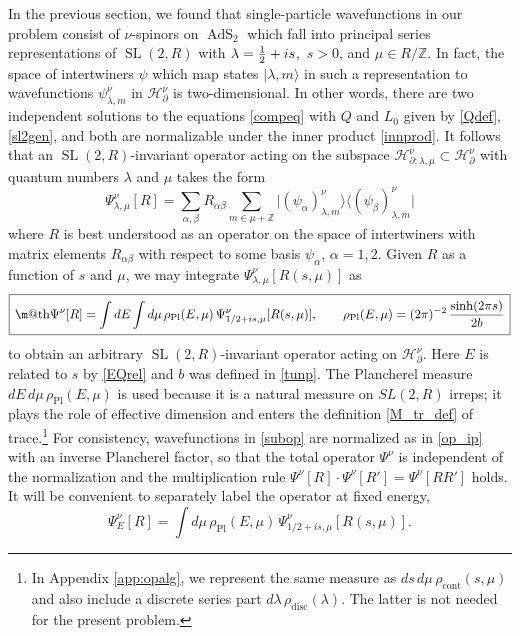 \documentclass[12pt]{article}
\makeatletter
\newcommand{\be}{\begin{equation}}
\newcommand{\ee}{\end{equation}}
\newcommand*{\wideboxed}[1]{\setlength{\fboxsep}{1ex}%
  \fbox{\m@th$\displaystyle#1$}}
\newcommand{\lt}{\left}
\newcommand{\rt}{\right}
\newcommand{\blangle}{\bigl\langle}
\newcommand{\brangle}{\bigr\rangle}
\newcommand*{\ket}[1]{|{#1}\rangle}
\newcommand*{\bbra}[1]{\blangle{#1}\big|}
\newcommand*{\bket}[1]{\big|{#1}\brangle}
\newcommand{\calH}{\mathcal{H}}
\newcommand{\ZZ}{\mathbb{Z}}
\newcommand{\RR}{\mathbb{R}}
\DeclareMathOperator{\SL}{SL}
\DeclareMathOperator{\tSL}{\widetilde{\mathrm{SL}}}
\DeclareMathOperator{\tAdS}{\widetilde{AdS}}
\newcommand{\rcont}{\rho_{\text{cont}}}
\newcommand{\rdisc}{\rho_{\text{disc}}}
\newcommand{\rPl}{\rho_{\text{Pl}}}
\newcommand{\al}{\alpha}
\newcommand{\lam}{\lambda}
\newcommand{\ov}{\over}
\newcommand{\p}{\partial}
\def\widetilde#1{#1}%
\def\SL{SL}
\def\RR{R}
\makeatother
\begin{document}
In the previous section, we found that single-particle wavefunctions in our problem consist of $\nu$-spinors on $\tAdS_2$ which fall into principal series representations of $\tSL(2,\RR)$ with $\lam={1 \ov 2}+i s$,\, $s>0$, and $\mu \in \RR/\ZZ$. In fact, the space of intertwiners $\psi$ which map states $\ket{\lam, m}$ in such a representation to wavefunctions $\psi^{\nu}_{\lam, m}$ in $\calH^{\nu}_{\p}$ is two-dimensional. In other words, there are two independent solutions to the equations \eqref{compeq} with $Q$ and $L_0$ given by \eqref{Qdef}, \eqref{sl2gen}, and both are normalizable under the inner product \eqref{innprod}. It follows that an $\tSL(2,\RR)$-invariant operator acting on the subspace $\calH^{\nu}_{\p; \lam, \mu}\subset \calH^{\nu}_{\p}$ with quantum numbers $\lam$ and $\mu$ takes the form
\be \label{subop}
\Psi^{\nu}_{\lam,\mu}[R]=\sum_{\alpha,\beta} R_{\alpha\beta} \sum_{m\in\mu+\ZZ}
\bket{\lt( \psi_{\alpha} \rt)^{\nu}_{\lambda,m}}
\bbra{\lt( \psi_{\beta} \rt)^{\nu}_{\lambda,m}}
\ee
where $R$ is best understood as an operator on the space of intertwiners with matrix elements $R_{\al\beta}$ with respect to some basis $\psi_{\al}$, $\al=1,2$. Given $R$ as a function of $s$ and $\mu$, we may integrate $\Psi^{\nu}_{\lam, \mu}[R(s,\mu)]$ as
\be \label{Mgenop}
\wideboxed{
\Psi^{\nu}[R]=\int dE \int d\mu\, \rPl(E, \mu)\, \Psi^{\nu}_{1/2+is,\mu}[R(s,\mu)], \qquad \rPl(E, \mu)=(2\pi)^{-2}\,{\sinh(2\pi s) \ov 2 b}}
\ee
to obtain an arbitrary $\tSL(2,\RR)$-invariant operator acting on $\calH^{\nu}_{\p}$. Here $E$ is related to $s$ by \eqref{EQrel} and $b$ was defined in \eqref{tunp}. The Plancherel measure $dE\,d\mu\,\rPl(E,\mu)$ is used because it is a natural measure on $\widetilde{\SL}(2,\RR)$ irreps; it plays the role of effective dimension and enters the definition \eqref{M_tr_def} of trace.\footnote{In Appendix \ref{app:opalg}, we represent the same measure as $ds\,d\mu\,\rcont(s,\mu)$ and also include a discrete series part $d\lambda\,\rdisc(\lambda)$. The latter is not needed for the present problem.} For consistency, wavefunctions in \eqref{subop} are normalized as in \eqref{op_ip} with an inverse Plancherel factor, so that the total operator $\Psi^{\nu}$ is independent of the normalization and the multiplication rule $\Psi^{\nu}[R]\cdot\Psi^{\nu}[R']=\Psi^{\nu}[RR']$ holds. It will be convenient to separately label the operator at fixed energy,
\begin{equation}\label{subop_E}
\Psi^{\nu}_E[R]=\int d\mu\, \rPl(E, \mu)\,\Psi^{\nu}_{1/2+is, \mu}[R(s,\mu)].
\end{equation}
\end{document}

